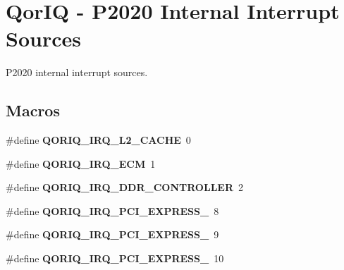 \hypertarget{group__QoriqInterruptP2020}{}\section{Qor\+IQ -\/ P2020 Internal Interrupt Sources}
\label{group__QoriqInterruptP2020}


P2020 internal interrupt sources.  


\subsection*{Macros}
\begin{DoxyCompactItemize}
\item 
\mbox{\label{group__QoriqInterruptP2020_ga6a6d02e1b6cdbf6a8b53bcf7a5b82f13}} 
\#define {\bfseries Q\+O\+R\+I\+Q\+\_\+\+I\+R\+Q\+\_\+\+L2\+\_\+\+C\+A\+C\+HE}~0
\item 
\mbox{\label{group__QoriqInterruptP2020_gaaf46619fb9483ec4bc266b08e4998a19}} 
\#define {\bfseries Q\+O\+R\+I\+Q\+\_\+\+I\+R\+Q\+\_\+\+E\+CM}~1
\item 
\mbox{\label{group__QoriqInterruptP2020_ga7d0415500346ec5f68f769ce06753845}} 
\#define {\bfseries Q\+O\+R\+I\+Q\+\_\+\+I\+R\+Q\+\_\+\+D\+D\+R\+\_\+\+C\+O\+N\+T\+R\+O\+L\+L\+ER}~2
\item 
\mbox{\label{group__QoriqInterruptP2020_ga319274962022a9e061160474e6e3d3a0}} 
\#define {\bfseries Q\+O\+R\+I\+Q\+\_\+\+I\+R\+Q\+\_\+\+P\+C\+I\+\_\+\+E\+X\+P\+R\+E\+S\+S\+\_}~8
\item 
\mbox{\label{group__QoriqInterruptP2020_ga9cd30ffa63284d3054746c06e1035686}} 
\#define {\bfseries Q\+O\+R\+I\+Q\+\_\+\+I\+R\+Q\+\_\+\+P\+C\+I\+\_\+\+E\+X\+P\+R\+E\+S\+S\+\_}~9
\item 
\mbox{\label{group__QoriqInterruptP2020_gaf129e8584648d0d8adeb5fd4c3609397}} 
\#define {\bfseries Q\+O\+R\+I\+Q\+\_\+\+I\+R\+Q\+\_\+\+P\+C\+I\+\_\+\+E\+X\+P\+R\+E\+S\+S\+\_}~10
\item 
\mbox{\label{group__QoriqInterruptP2020_ga1229d71c8bb47b2752e0446859d48f9c}} 

\end{DoxyCompactItemize}
